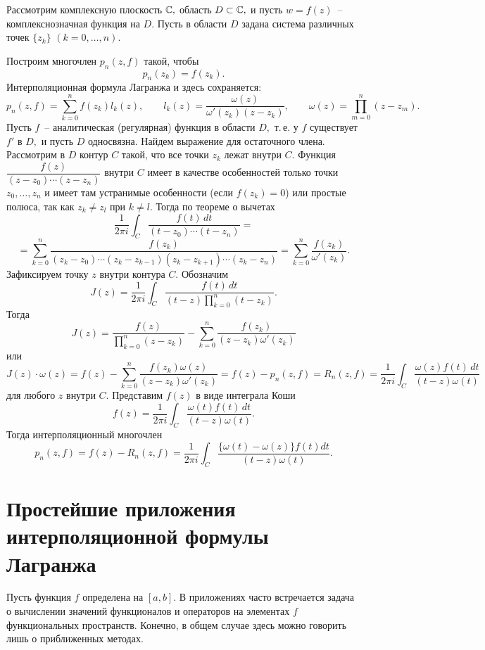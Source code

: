 Рассмотрим комплексную плоскость $\mathbb{C},$ область {$D \subset \mathbb{C},$} и пусть $w=f(z)$~--
комплекснозначная функция на $D.$ Пусть в области $D$
задана система различных точек $\{z_k\}$ $(k=0,\dots ,n).$

Построим многочлен $p_n(z,f)$
такой, чтобы
\[
  p_n(z_k)=f(z_k).
\]
Интерполяционная формула Лагранжа и здесь сохраняется:
\[
  p_n(z,f)=\sum\limits_{k=0}^n f(z_k)l_k(z),\qquad {l_k(z)=\frac{\omega(z)}{\omega'(z_k)
  (z-z_k)},\qquad
  \omega(z)=\prod_{m=0}^n(z-z_m)}.
\]
Пусть $f$~-- аналитическая (регулярная) функция в области $D,$ т.\,е. у
$f$ существует $f'$ в $D,$ и пусть $D$ односвязна. Найдем выражение для
остаточного члена. Рассмотрим в $D$ контур $C$ такой, что все точки $z_k$
лежат внутри $C.$ Функция $\dfrac{f(z)}{(z-z_0)\cdots (z-z_n)}$ внутри
$C$ имеет в качестве особенностей только точки $z_0,\dots ,z_n$ и имеет там
{устранимые особенности (если $f(z_k)=0$) или} простые полюса,
так как $z_k \ne z_l$ при $k \ne l.$ Тогда {по теореме о вычетах}
$$
  \frac{1}{2\pi i}\int_C\frac{f(t)\,dt}{(t-z_0)\cdots (t-z_n)}
  =
$$
$$
  =\sum\limits_{k=0}^n \frac{f(z_k)}{(z_k-z_0)\cdots
                    (z_k-z_{k-1})(z_k-z_{k+1})\cdots (z_k-z_n)}
 = \sum\limits_{k=0}^n \frac{f(z_k)}{\omega'(z_k)}.
$$
Зафиксируем точку $z$
внутри контура $C.$
Обозначим
\[
  J(z)=\frac{1}{2\pi i}\int_C \frac{f(t)\,dt}{(t-z)\prod_{k=0}^n(t-z_k)}.
\]
Тогда
\[
  J(z)=\frac{f(z)}{\prod_{k=0}^n(z-z_k)}-
  \sum\limits_{k=0}^n \frac{f(z_k)}{(z-z_k)\omega'(z_k)}
\]
или
\[
  J(z)\cdot \omega(z)=f(z)-\sum\limits_{k=0}^n
            \frac{f(z_k)\omega(z)}{(z-z_k)\omega'(z_k)}={f(z)-p_n(z,f)=}R_n(z,f)
 =\frac{1}{2\pi i}\int_C \frac{\omega(z)f(t)\,dt}{(t-z)\omega(t)}
\]
для любого $z$ внутри $C.$ Представим $f(z)$ в виде интеграла Коши
\[
{f(z)=}\frac{1}{2\pi i}\int_C \frac{\omega(t)f(t)\,dt}{(t-z)\omega(t)}.
\]
Тогда интерполяционный многочлен
\[
  p_n(z,f)=f(z)-R_n(z,f)=
 \frac{1}{2\pi i}\int_C \frac{\{\omega(t)-\omega(z)\}f(t)dt}{(t-z)\omega(t)}.
\]

\section{Простейшие приложения\\ интерполяционной формулы
Лагранжа}\label{3.4}


Пусть {функция $f$} определена на $[a,b].$ В приложениях {часто} встречается
задача о вычислении значений функционалов и операторов на элементах $f$
функциональных пространств. Конечно, в общем случае здесь
можно говорить лишь о приближенных методах.

